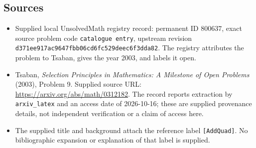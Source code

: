 \documentclass[11pt]{article}
\begin{document}
\subsection{Sources}
\begin{itemize}
\item Supplied local UnsolvedMath registry record: permanent ID \(800637\), exact source problem code \texttt{catalogue entry}, upstream revision \texttt{d371ee917ac9647fbb06cd6fc529deec6f3dda82}. The registry attributes the problem to Tsaban, gives the year 2003, and labels it open.
\item Tsaban, \emph{Selection Principles in Mathematics: A Milestone of Open Problems} (2003), Problem 9. Supplied source URL: \url{https://arxiv.org/abs/math/0312182}. The record reports extraction by \texttt{arxiv\_latex} and an access date of 2026-10-16; these are supplied provenance details, not independent verification or a claim of access here.
\item The supplied title and background attach the reference label \texttt{[AddQuad]}. No bibliographic expansion or explanation of that label is supplied.
\end{itemize}
\end{document}
